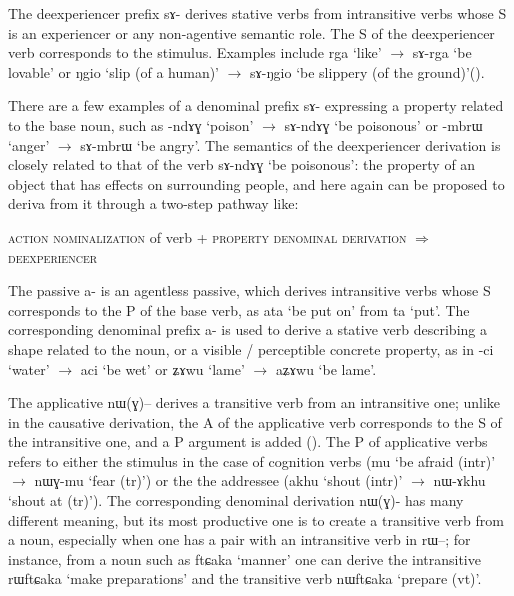 \documentclass[oldfontcommands,oneside,a4paper,11pt]{article}
\newcommand{\ipa}[1]{{\phon #1}} %
\begin{document}
The deexperiencer prefix \ipa{sɤ-} derives stative verbs from intransitive verbs whose S is an experiencer or any non-agentive semantic role. The S of the deexperiencer verb corresponds to the stimulus. Examples include \ipa{rga} `like' $\rightarrow$ \ipa{sɤ-rga} `be lovable' or \ipa{ŋgio} `slip (of a human)' $\rightarrow$ \ipa{sɤ-ŋgio} `be slippery (of the ground)'(\citealt{jacques12demotion}).

There are a few examples of a denominal prefix \ipa{sɤ-} expressing a property related to the base noun, such as \ipa{-ndɤɣ} `poison' $\rightarrow$ \ipa{sɤ-ndɤɣ} `be poisonous' or \ipa{-mbrɯ} `anger'  $\rightarrow$ \ipa{sɤ-mbrɯ} `be angry'. The semantics of the deexperiencer derivation is closely related to that of the verb  \ipa{sɤ-ndɤɣ} `be poisonous': the property of an object that has effects on surrounding people, and here again can be proposed to deriva from it through a two-step pathway like:

\begin{exe}
\ex \label{ex:pathway}
\glt \textsc{action nominalization} of verb + \textsc{property denominal derivation} $\Rightarrow$ \textsc{deexperiencer}
\end{exe}

The passive \ipa{a-} is an agentless passive, which derives intransitive verbs whose S corresponds to the P of the base verb, as \ipa{ata}  `be put on' from \ipa{ta} `put'. The corresponding denominal prefix \ipa{a-} is used to derive a stative verb describing a shape related to the noun, or a visible / perceptible concrete property, as in \ipa{-ci} `water' $\rightarrow$  \ipa{aci} `be wet' or  \ipa{ʑɤwu} `lame' $\rightarrow$  \ipa{aʑɤwu} `be lame'.

The applicative \ipa{nɯ(ɣ)--} derives a transitive verb from an intransitive one; unlike in the causative derivation, the A of the applicative verb corresponds to the S of the intransitive one, and a P argument is added (\citealt{jacques13tropative}). The P of applicative verbs refers to either the stimulus in the case of cognition verbs (\ipa{mu} `be afraid (intr)' $\rightarrow$ \ipa{nɯɣ-mu} `fear (tr)') or the the addressee (\ipa{akhu} `shout (intr)'  $\rightarrow$ \ipa{nɯ-ɤkhu} `shout at (tr)'). The corresponding denominal derivation \ipa{nɯ(ɣ)-} has many different meaning, but its most productive one is to create a transitive verb from a noun, especially when one has a pair with an intransitive verb in \ipa{rɯ--}; for instance, from a noun such as \ipa{ftɕaka} `manner' one can derive the intransitive \ipa{rɯftɕaka} `make preparations' and the transitive verb \ipa{nɯftɕaka} `prepare (vt)'. 
\end{document}
